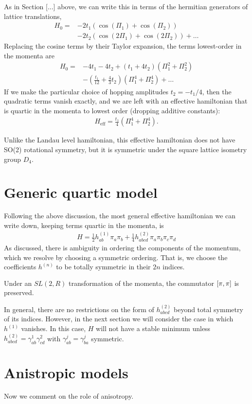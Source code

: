 \documentclass[aps,prb,twocolumn,letterpaper,twoside,nobalancelastpage,groupedaddress,amsmath,amssymb,floatfix,citeautoscript]{revtex4-1}
\begin{document}
As in Section [...] above, we can write this in terms of the hermitian generators of lattice translations,
\begin{align*}
H_0 = &-2t_1\left(\cos(\Pi_1) + \cos(\Pi_2)\right)\\ &- 2t_2\left(\cos(2\Pi_1) + \cos(2\Pi_2)\right) +\ldots
\end{align*}
Replacing the cosine terms by their Taylor expansion, the terms lowest-order in the momenta are 
\begin{align*}
H_0 = &-4 t_1 - 4 t_2 + (t_1 + 4t_2) \left(\Pi_1^2 + \Pi_2^2\right) \\
&- \left(\frac{t_1}{12} + \frac{4}{3}t_2\right) \left(\Pi_1^4 + \Pi_2^4\right) + \ldots
\end{align*}
If we make the particular choice of hopping amplitudes $t_2 = -t_1/4$, then the quadratic terms vanish exactly, and we are left with an effective hamiltonian that is quartic in the momenta to lowest order (dropping additive constants):
\begin{align*}
H_{\text{eff}} = \frac{t_1}{4} \left(\Pi_1^4 + \Pi_2^4\right).
\end{align*}

Unlike the Landau level hamiltonian, this effective hamiltonian does not have SO(2) rotational symmetry, but it is symmetric under the square lattice isometry group $D_4$.



\section{Generic quartic model}
Following the above discussion, the most general effective hamiltonian we can write down, keeping terms quartic in the momenta, is 
\begin{align*}
H = \frac{1}{2}h^{(1)}_{ab} \pi_a \pi_b + \frac{1}{4}h^{(2)}_{abcd} \pi_a \pi_b \pi_c \pi_d
\end{align*}
As discussed, there is ambiguity in ordering the components of the momentum, which we resolve by choosing a symmetric ordering. That is, we choose the coefficients $h^{(n)}$ to be totally symmetric in their $2n$ indices.

Under an $SL(2,R)$ transformation of the momenta, the commutator $\comm{\pi}{\pi}$ is preserved.

In general, there are no restrictions on the form of $h^{(2)}_{abcd}$ beyond total symmetry of its indices. However, in the next section we will consider the case in which $h^{(1)}$ vanishes. In this case, $H$ will not have a stable minimum unless $h^{(2)}_{abcd} = \gamma^1_{ab}\gamma^2_{cd}$ with $\gamma^j_{ab} = \gamma^{j}_{ba}$ symmetric.


\section{Anistropic models}
Now we comment on the role of anisotropy.

\begin{acknowledgments}

\end{acknowledgments}


\end{document}
